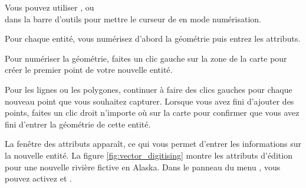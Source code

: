 Vous pouvez utiliser ,  ou\\  dans la barre d'outils pour mettre le curseur de \qg en mode numérisation.

Pour chaque entité, vous numérisez d'abord la géométrie puis entrez les attributs.

Pour numériser la géométrie, faites un clic gauche sur la zone de la carte pour créer le premier point de votre nouvelle entité.

Pour les lignes ou les polygones, continuer à faire des clics gauches pour chaque nouveau point que vous souhaitez capturer. Lorsque vous avez fini d'ajouter des points, faites un clic droit n'importe où sur la carte pour confirmer que vous avez fini d'entrer la géométrie de cette entité.

La fenêtre des attributs apparaît, ce qui vous permet d'entrer les informations 
sur la nouvelle entité. La figure \ref{fig:vector_digitising} montre les 
attributs d'édition pour une nouvelle rivière fictive en Alaska. Dans le panneau 
 du menu  \arrow {}, 
vous pouvez activez  et .

